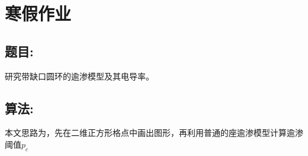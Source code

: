 \documentclass[utf8]{ctexart}
\author{syx}
\begin{document}
	\section*{寒假作业}
	\subsection*{题目:}
	研究带缺口圆环的逾渗模型及其电导率。
	\subsection*{算法:}
	本文思路为，先在二维正方形格点中画出图形，再利用普通的座逾渗模型计算逾渗阈值$p_c$
	
	
\end{document}
